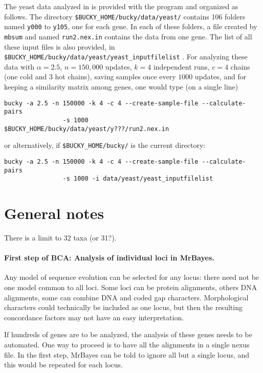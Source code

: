 \documentclass[12pt,english,final,letterpaper]{article}
\begin{document}
The yeast data analyzed in \cite{ane-etal-2007} is provided with the program
and organized as follows. The directory
\verb+$BUCKY_HOME/bucky/data/yeast/+ %
contains 106 folders named {\tt y000} to {\tt y105}, one for each gene. 
In each of these folders, a file created by {\tt mbsum} and named 
{\tt run2.nex.in} contains the data from one gene.
The list of all these input files is also provided, in 
\verb+$BUCKY_HOME/bucky/data/yeast/yeast_inputfilelist+ .
For analyzing these data with $\alpha=2.5$, 
$n=150,000$ updates, $k=4$ independent runs, $c=4$ chains 
(one cold and 3 hot chains),
saving samples once every $1000$ updates, and for keeping a similarity 
matrix among genes, one would type (on a single line)
\begin{verbatim}
bucky -a 2.5 -n 150000 -k 4 -c 4 --create-sample-file --calculate-pairs
                -s 1000   $BUCKY_HOME/bucky/data/yeast/y???/run2.nex.in
\end{verbatim}%
or alternatively, if \verb+$BUCKY_HOME/bucky/+ is the current directory:%
\begin{verbatim}
bucky -a 2.5 -n 150000 -k 4 -c 4 --create-sample-file --calculate-pairs
                -s 1000 -i data/yeast/yeast_inputfilelist
\end{verbatim}

\section{General notes}

There is a limit to 32 taxa (or 31?).

\paragraph{First step of BCA: Analysis of individual loci in MrBayes.}
Any model of sequence evolution can be selected for any locus: there need 
not be one model common to all loci. Some loci can be protein alignments,
others DNA alignments, some can combine DNA and coded gap characters.
Morphological characters could technically be included as one locus, 
but then the resulting concordance factors may not have an
easy interpretation.

If hundreds of genes are to be analyzed, the analysis of these
genes needs to be automated. One way to proceed is to have 
all the alignments in a single nexus file. In the first step, MrBayes 
can be told to ignore all but a single locus, and this would be repeated 
for each locus.
\end{document}
